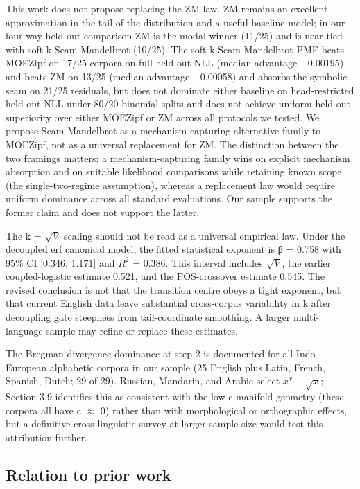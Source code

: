 \documentclass[11pt]{article}
\begin{document}
This work does not propose replacing the ZM law. ZM remains an excellent approximation in the tail of the distribution and a useful baseline model; in our four-way held-out comparison ZM is the modal winner (11/25) and is near-tied with soft-k Seam-Mandelbrot (10/25). The soft-k Seam-Mandelbrot PMF beats MOEZipf on 17/25 corpora on full held-out NLL (median advantage −0.00195) and beats ZM on 13/25 (median advantage −0.00058) and absorbs the symbolic seam on 21/25 residuals, but does not dominate either baseline on head-restricted held-out NLL under 80/20 binomial splits and does not achieve uniform held-out superiority over either MOEZipf or ZM across all protocols we tested. We propose Seam-Mandelbrot as a mechanism-capturing alternative family to MOEZipf, not as a universal replacement for ZM. The distinction between the two framings matters: a mechanism-capturing family wins on explicit mechanism absorption and on suitable likelihood comparisons while retaining known scope (the single-two-regime assumption), whereas a replacement law would require uniform dominance across all standard evaluations. Our sample supports the former claim and does not support the latter.

The k = $\sqrt{V}$ scaling should not be read as a universal empirical law. Under the decoupled erf canonical model, the fitted statistical exponent is β = 0.758 with 95\% CI [0.346, 1.171] and $R^2$ = 0.386. This interval includes $\sqrt{V}$, the earlier coupled-logistic estimate 0.521, and the POS-crossover estimate 0.545. The revised conclusion is not that the transition centre obeys a tight exponent, but that current English data leave substantial cross-corpus variability in k after decoupling gate steepness from tail-coordinate smoothing. A larger multi-language sample may refine or replace these estimates.

The Bregman-divergence dominance at step 2 is documented for all Indo-European alphabetic corpora in our sample (25 English plus Latin, French, Spanish, Dutch; 29 of 29). Russian, Mandarin, and Arabic select $x^x-\sqrt{x}$; Section 3.9 identifies this as consistent with the low-c manifold geometry (these corpora all have c $\approx$ 0) rather than with morphological or orthographic effects, but a definitive cross-linguistic survey at larger sample size would test this attribution further.

\subsection{Relation to prior work}
\end{document}
